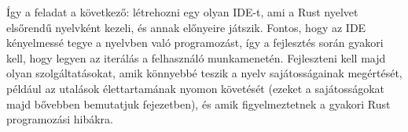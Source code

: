 Így a feladat a következő: létrehozni egy olyan IDE-t, ami a Rust nyelvet elsőrendű nyelvként kezeli, és annak előnyeire játszik. 
Fontos, hogy az IDE kényelmessé tegye a nyelvben való programozást, így a fejlesztés során gyakori kell, hogy legyen az iterálás a felhasználó munkamenetén. 
Fejleszteni kell majd olyan szolgáltatásokat, amik könnyebbé teszik a nyelv sajátosságainak megértését, például az utalások élettartamának nyomon követését 
(ezeket a sajátosságokat majd bővebben bemutatjuk  fejezetben), és amik figyelmeztetnek a gyakori Rust programozási hibákra.



